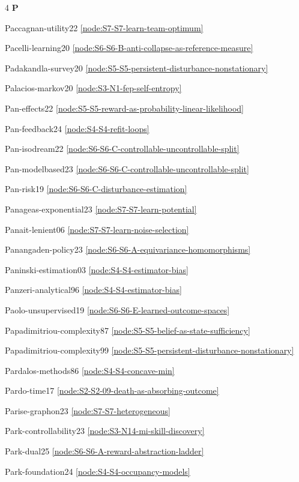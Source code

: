 \documentclass[10pt]{article}
\begin{document}
{\begin{multicols}{4}
\smallskip\textbf{P}\par
Paccagnan-utility22 \hfill \ref{node:S7-S7-learn-team-optimum}\par
Pacelli-learning20 \hfill \ref{node:S6-S6-B-anti-collapse-as-reference-measure}\par
Padakandla-survey20 \hfill \ref{node:S5-S5-persistent-disturbance-nonstationary}\par
Palacios-markov20 \hfill \ref{node:S3-N1-fep-self-entropy}\par
Pan-effects22 \hfill \ref{node:S5-S5-reward-as-probability-linear-likelihood}\par
Pan-feedback24 \hfill \ref{node:S4-S4-refit-loops}\par
Pan-isodream22 \hfill \ref{node:S6-S6-C-controllable-uncontrollable-split}\par
Pan-modelbased23 \hfill \ref{node:S6-S6-C-controllable-uncontrollable-split}\par
Pan-risk19 \hfill \ref{node:S6-S6-C-disturbance-estimation}\par
Panageas-exponential23 \hfill \ref{node:S7-S7-learn-potential}\par
Panait-lenient06 \hfill \ref{node:S7-S7-learn-noise-selection}\par
Panangaden-policy23 \hfill \ref{node:S6-S6-A-equivariance-homomorphisms}\par
Paninski-estimation03 \hfill \ref{node:S4-S4-estimator-bias}\par
Panzeri-analytical96 \hfill \ref{node:S4-S4-estimator-bias}\par
Paolo-unsupervised19 \hfill \ref{node:S6-S6-E-learned-outcome-spaces}\par
Papadimitriou-complexity87 \hfill \ref{node:S5-S5-belief-as-state-sufficiency}\par
Papadimitriou-complexity99 \hfill \ref{node:S5-S5-persistent-disturbance-nonstationary}\par
Pardalos-methods86 \hfill \ref{node:S4-S4-concave-min}\par
Pardo-time17 \hfill \ref{node:S2-S2-09-death-as-absorbing-outcome}\par
Parise-graphon23 \hfill \ref{node:S7-S7-heterogeneous}\par
Park-controllability23 \hfill \ref{node:S3-N14-mi-skill-discovery}\par
Park-dual25 \hfill \ref{node:S6-S6-A-reward-abstraction-ladder}\par
Park-foundation24 \hfill \ref{node:S4-S4-occupancy-models}\par

\end{multicols}}
\end{document}
